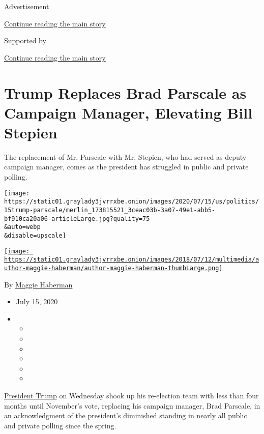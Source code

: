Advertisement

\protect\hyperlink{after-top}{Continue reading the main story}

Supported by

\protect\hyperlink{after-sponsor}{Continue reading the main story}

\hypertarget{trump-replaces-brad-parscale-as-campaign-manager-elevating-bill-stepien}{%
\section{Trump Replaces Brad Parscale as Campaign Manager, Elevating
Bill
Stepien}\label{trump-replaces-brad-parscale-as-campaign-manager-elevating-bill-stepien}}

The replacement of Mr. Parscale with Mr. Stepien, who had served as
deputy campaign manager, comes as the president has struggled in public
and private polling.

\texttt{[image: https://static01.graylady3jvrrxbe.onion/images/2020/07/15/us/politics/15trump-parscale/merlin\_173815521\_3ceac03b-3a07-49e1-abb5-bf910ca20a06-articleLarge.jpg?quality=75\\\&auto=webp\\\&disable=upscale]}

\href{https://www.nytimes3xbfgragh.onion/by/maggie-haberman}{\texttt{[image: https://static01.graylady3jvrrxbe.onion/images/2018/07/12/multimedia/author-maggie-haberman/author-maggie-haberman-thumbLarge.png]}}

By \href{https://www.nytimes3xbfgragh.onion/by/maggie-haberman}{Maggie
Haberman}

\begin{itemize}
\item
  July 15, 2020
\item
  \begin{itemize}
  \item
  \item
  \item
  \item
  \item
  \item
  \end{itemize}
\end{itemize}

\href{https://www.nytimes3xbfgragh.onion/interactive/2020/us/elections/donald-trump.html}{President
Trump} on Wednesday shook up his re-election team with less than four
months until November's vote, replacing his campaign manager, Brad
Parscale, in an acknowledgment of the president's
\href{https://www.nytimes3xbfgragh.onion/2020/06/25/upshot/poll-2020-biden-battlegrounds.html}{diminished
standing} in nearly all public and private polling since the spring.


